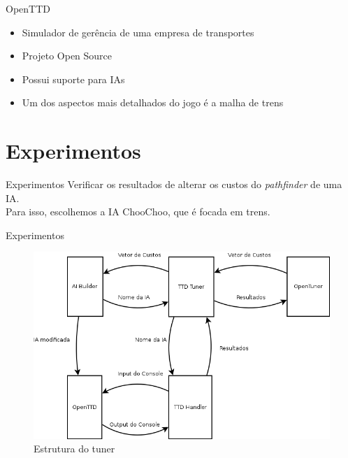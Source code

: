 \documentclass[10pt]{beamer}
\begin{document}
\begin{frame}{OpenTTD}	
	\begin{itemize}	[<+- | alert@+>]
		\item Simulador de gerência de uma empresa de transportes
		\item Projeto Open Source
		\item Possui suporte para IAs
		\item Um dos aspectos mais detalhados do jogo é a malha de trens
	\end{itemize}
\end{frame}

\section{Experimentos}
\begin{frame}{Experimentos}
	Verificar os resultados de alterar os custos do \textit{pathfinder} de uma IA.\pause\\
	Para isso, escolhemos a IA ChooChoo, que é focada em trens.
\end{frame}

\begin{frame}{Experimentos}
	\begin{figure}
\centering
\includegraphics[width=1\linewidth]{Diagrama1}
\caption{Estrutura do tuner}
\label{fig:Diagrama1}
\end{figure}

\end{frame}
	
\end{document}
